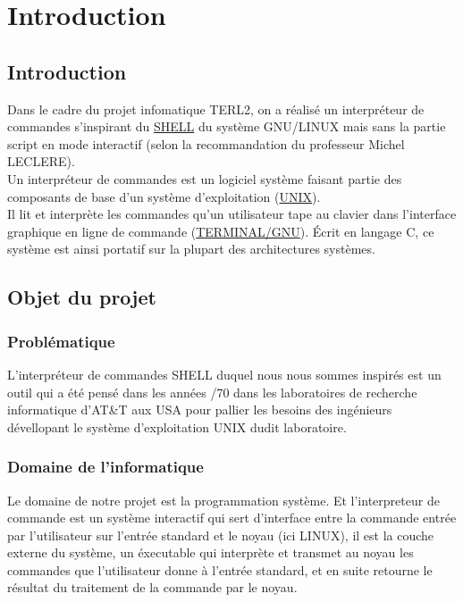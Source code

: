 \chapter{Introduction}
\section{Introduction}
Dans le cadre du projet infomatique {\selectfont TERL2}, on a réalisé un interpréteur de commandes s'inspirant du \href{https://fr.wikipedia.org/wiki/Linux}{\selectfont SHELL} du système {\selectfont GNU/LINUX} mais sans la partie script en mode interactif (selon la recommandation  du professeur Michel {\selectfont LECLERE}).\\

Un interpréteur de commandes est un logiciel système faisant partie des composants de base d'un système d'exploitation (\href{https://fr.wikipedia.org/wiki/Shell_Unix}{\selectfont UNIX}). \\
Il lit et interprète les commandes qu'un utilisateur tape au clavier dans l'interface graphique en ligne de commande (\href{https://fr.wikipedia.org/wiki/Terminal}{\selectfont TERMINAL/GNU}). 
Écrit en langage C, ce système est ainsi portatif sur la plupart des architectures systèmes.\\

\section{Objet du projet}
\subsection{Problématique}

L'interpréteur de commandes SHELL duquel nous nous sommes inspirés est un outil qui a été pensé dans les années {/70} dans les laboratoires de recherche informatique d'{\selectfont AT\&T} aux {\selectfont USA} pour pallier les besoins des ingénieurs dévellopant le système d'exploitation UNIX dudit laboratoire.

\subsection{Domaine de l'informatique}
 
Le domaine de notre projet est la programmation système. Et l'interpreteur de commande est un système interactif qui sert d'interface entre la commande entrée par l'utilisateur sur l'entrée standard et le noyau (ici {\selectfont LINUX}), il est la couche externe du système, un éxecutable qui interprète et transmet au noyau les commandes que l'utilisateur donne à l'entrée standard, et en suite retourne le résultat du traitement de la commande par le noyau.


